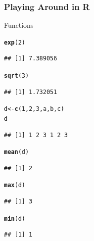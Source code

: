 \documentclass{beamer}\usepackage[]{graphicx}\usepackage[]{color}
\makeatletter
\newcommand{\hlnum}[1]{\textcolor[rgb]{0.686,0.059,0.569}{#1}}%
\newcommand{\hlstd}[1]{\textcolor[rgb]{0.345,0.345,0.345}{#1}}%
\newcommand{\hlkwb}[1]{\textcolor[rgb]{0.69,0.353,0.396}{#1}}%
\newcommand{\hlkwd}[1]{\textcolor[rgb]{0.737,0.353,0.396}{\textbf{#1}}}%
\newenvironment{kframe}{%
 \def\at@end@of@kframe{}%
 \ifinner\ifhmode%
  \def\at@end@of@kframe{\end{minipage}}%
  \begin{minipage}{\columnwidth}%
 \fi\fi%
 \def\FrameCommand##1{\hskip\@totalleftmargin \hskip-\fboxsep
 \colorbox{shadecolor}{##1}\hskip-\fboxsep
     \hskip-\linewidth \hskip-\@totalleftmargin \hskip\columnwidth}%
 \MakeFramed {\advance\hsize-\width
   \@totalleftmargin\z@ \linewidth\hsize
   \@setminipage}}%
 {\par\unskip\endMakeFramed%
 \at@end@of@kframe}
\newenvironment{knitrout}{}{} %
\makeatother
\begin{document}
\begin{frame}[fragile]\frametitle{Playing Around in R}
    Functions
\begin{knitrout}\footnotesize
{}\color{fgcolor}\begin{kframe}
\begin{alltt}
\hlkwd{exp}\hlstd{(}\hlnum{2}\hlstd{)}
\end{alltt}
\begin{verbatim}
## [1] 7.389056
\end{verbatim}
\begin{alltt}
\hlkwd{sqrt}\hlstd{(}\hlnum{3}\hlstd{)}
\end{alltt}
\begin{verbatim}
## [1] 1.732051
\end{verbatim}
\begin{alltt}
\hlstd{d} \hlkwb{<-} \hlkwd{c}\hlstd{(}\hlnum{1}\hlstd{,} \hlnum{2}\hlstd{,} \hlnum{3}\hlstd{, a, b, c)}
\hlstd{d}
\end{alltt}
\begin{verbatim}
## [1] 1 2 3 1 2 3
\end{verbatim}
\begin{alltt}
\hlkwd{mean}\hlstd{(d)}
\end{alltt}
\begin{verbatim}
## [1] 2
\end{verbatim}
\begin{alltt}
\hlkwd{max}\hlstd{(d)}
\end{alltt}
\begin{verbatim}
## [1] 3
\end{verbatim}
\begin{alltt}
\hlkwd{min}\hlstd{(d)}
\end{alltt}
\begin{verbatim}
## [1] 1
\end{verbatim}
\end{kframe}
\end{knitrout}
\end{frame}
\end{document}
